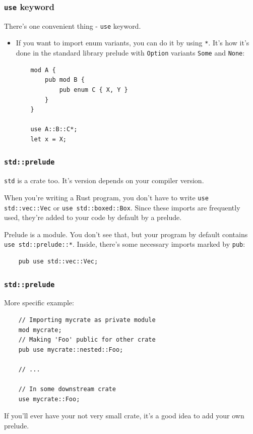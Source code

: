 \documentclass[aspectratio=1610,t]{beamer}
\begin{document}

\begin{frame}[fragile]
\frametitle{\texttt{use} keyword}
There's one convenient thing - \texttt{use} keyword.

\begin{itemize}
    \item<1-> If you want to import enum variants, you can do it by using \texttt{*}. It's how it's done in the standard library prelude with \texttt{Option} variants \texttt{Some} and \texttt{None}:
    
    \begin{verbatim}
    mod A {
        pub mod B {
            pub enum C { X, Y }
        }
    }

    use A::B::C*;
    let x = X;
    \end{verbatim}
\end{itemize}
\end{frame}


\begin{frame}[fragile]
\frametitle{\texttt{std::prelude}}
\texttt{std} is a crate too. It's version depends on your compiler version.

When you're writing a Rust program, you don't have to write \texttt{use std::vec::Vec} or \texttt{use std::boxed::Box}. Since these imports are frequently used, they're added to your code by default by a prelude.

Prelude is a module. You don't see that, but your program by default contains \texttt{use std::prelude::*}. Inside, there's some necessary imports marked by \texttt{pub}:

\begin{verbatim}
    pub use std::vec::Vec;
\end{verbatim}
\end{frame}


\begin{frame}[fragile]
\frametitle{\texttt{std::prelude}}
More specific example:

\begin{verbatim}
    // Importing mycrate as private module
    mod mycrate;
    // Making 'Foo' public for other crate
    pub use mycrate::nested::Foo;

    // ...

    // In some downstream crate
    use mycrate::Foo;
\end{verbatim}

If you'll ever have your not very small crate, it's a good idea to add your own prelude.
\end{frame}
\end{document}
